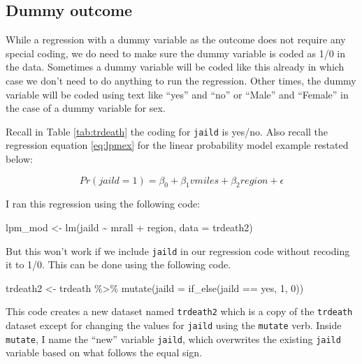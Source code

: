 \documentclass[
]{book}
\makeatletter
\newenvironment{Shaded}{\begin{snugshade}}{\end{snugshade}}
\newcommand{\AttributeTok}[1]{\textcolor[rgb]{0.61,0.61,0.61}{#1}}
\newcommand{\DecValTok}[1]{\textcolor[rgb]{0.06,0.06,0.06}{#1}}
\newcommand{\FunctionTok}[1]{\textcolor[rgb]{0,0,0}{#1}}
\newcommand{\NormalTok}[1]{#1}
\newcommand{\OtherTok}[1]{\textcolor[rgb]{0.37,0.37,0.37}{#1}}
\newcommand{\SpecialCharTok}[1]{\textcolor[rgb]{0,0,0}{#1}}
\newcommand{\StringTok}[1]{\textcolor[rgb]{0.5,0.5,0.5}{#1}}
\newenvironment{kframe}{%
\medskip{}
\setlength{\fboxsep}{.8em}
 \def\at@end@of@kframe{}%
 \ifinner\ifhmode%
  \def\at@end@of@kframe{\end{minipage}}%
  \begin{minipage}{\columnwidth}%
 \fi\fi%
 \def\FrameCommand##1{\hskip\@totalleftmargin \hskip-\fboxsep
 \colorbox{shadecolor}{##1}\hskip-\fboxsep
     \hskip-\linewidth \hskip-\@totalleftmargin \hskip\columnwidth}%
 \MakeFramed {\advance\hsize-\width
   \@totalleftmargin\z@ \linewidth\hsize
   \@setminipage}}%
 {\par\unskip\endMakeFramed%
 \at@end@of@kframe}
\renewenvironment{Shaded}{\begin{kframe}}{\end{kframe}}
\makeatother
\begin{document}
\hypertarget{dummy-outcome}{%
\subsection{Dummy outcome}\label{dummy-outcome}}

While a regression with a dummy variable as the outcome does not require any special coding, we do need to make sure the dummy variable is coded as 1/0 in the data. Sometimes a dummy variable will be coded like this already in which case we don't need to do anything to run the regression. Other times, the dummy variable will be coded using text like ``yes'' and ``no'' or ``Male'' and ``Female'' in the case of a dummy variable for sex.

Recall in Table \ref{tab:trdeath} the coding for \texttt{jaild} is yes/no. Also recall the regression equation \eqref{eq:lpmex} for the linear probability model example restated below:

\[Pr(jaild=1)=\beta_0+\beta_1vmiles+\beta_2region+\epsilon\]

I ran this regression using the following code:

\begin{Shaded}
\begin{Highlighting}[]
\NormalTok{lpm\_mod }\OtherTok{\textless{}{-}} \FunctionTok{lm}\NormalTok{(jaild }\SpecialCharTok{\textasciitilde{}}\NormalTok{ mrall }\SpecialCharTok{+}\NormalTok{ region, }\AttributeTok{data =}\NormalTok{ trdeath2)}
\end{Highlighting}
\end{Shaded}

But this won't work if we include \texttt{jaild} in our regression code without recoding it to 1/0. This can be done using the following code.

\begin{Shaded}
\begin{Highlighting}[]
\NormalTok{trdeath2 }\OtherTok{\textless{}{-}}\NormalTok{ trdeath }\SpecialCharTok{\%\textgreater{}\%} 
  \FunctionTok{mutate}\NormalTok{(}\AttributeTok{jaild =} \FunctionTok{if\_else}\NormalTok{(jaild }\SpecialCharTok{==} \StringTok{\textquotesingle{}yes\textquotesingle{}}\NormalTok{, }\DecValTok{1}\NormalTok{, }\DecValTok{0}\NormalTok{))}
\end{Highlighting}
\end{Shaded}

This code creates a new dataset named \texttt{trdeath2} which is a copy of the \texttt{trdeath} dataset except for changing the values for \texttt{jaild} using the \texttt{mutate} verb. Inside \texttt{mutate}, I name the ``new'' variable \texttt{jaild}, which overwrites the existing \texttt{jaild} variable based on what follows the equal sign.
\end{document}
